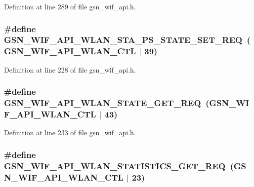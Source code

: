 Definition at line 289 of file gsn\_\-wif\_\-api.h.

\hypertarget{a00606_a5b4151a75aa80c25bfe4e7e8a7c0b30b}{
\subsubsection[{GSN\_\-WIF\_\-API\_\-WLAN\_\-STA\_\-PS\_\-STATE\_\-SET\_\-REQ}]{\setlength{\rightskip}{0pt plus 5cm}\#define GSN\_\-WIF\_\-API\_\-WLAN\_\-STA\_\-PS\_\-STATE\_\-SET\_\-REQ~(GSN\_\-WIF\_\-API\_\-WLAN\_\-CTL $|$ 39)}}
\label{a00606_a5b4151a75aa80c25bfe4e7e8a7c0b30b}


Definition at line 228 of file gsn\_\-wif\_\-api.h.

\hypertarget{a00606_aeb820162c0c23597e33fe405490eec14}{
\subsubsection[{GSN\_\-WIF\_\-API\_\-WLAN\_\-STATE\_\-GET\_\-REQ}]{\setlength{\rightskip}{0pt plus 5cm}\#define GSN\_\-WIF\_\-API\_\-WLAN\_\-STATE\_\-GET\_\-REQ~(GSN\_\-WIF\_\-API\_\-WLAN\_\-CTL $|$ 43)}}
\label{a00606_aeb820162c0c23597e33fe405490eec14}


Definition at line 233 of file gsn\_\-wif\_\-api.h.

\hypertarget{a00606_a35bb3dead77b7a506dd5809fd4ceb4e6}{
\subsubsection[{GSN\_\-WIF\_\-API\_\-WLAN\_\-STATISTICS\_\-GET\_\-REQ}]{\setlength{\rightskip}{0pt plus 5cm}\#define GSN\_\-WIF\_\-API\_\-WLAN\_\-STATISTICS\_\-GET\_\-REQ~(GSN\_\-WIF\_\-API\_\-WLAN\_\-CTL $|$ 23)}}
\label{a00606_a35bb3dead77b7a506dd5809fd4ceb4e6}



